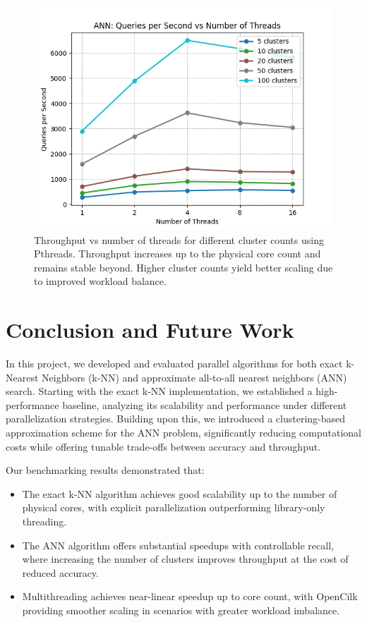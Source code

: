 \documentclass{article}
\begin{document}
\begin{figure}
    \centering
    \includegraphics[width=0.5\linewidth]{figures/ann_throughput_vs_threads.png}
    \caption{Throughput vs number of threads for different cluster counts using Pthreads. Throughput 
    increases up to the physical core count and remains stable beyond. Higher cluster counts yield better 
    scaling due to improved workload balance.}
    \label{fig:ann_throughput_vs_threads}
\end{figure}

\section{Conclusion and Future Work}

In this project, we developed and evaluated parallel algorithms for both exact k-Nearest Neighbors (k-NN) 
and approximate all-to-all nearest neighbors (ANN) search. Starting with the exact k-NN implementation, 
we established a high-performance baseline, analyzing its scalability and performance under different 
parallelization strategies. Building upon this, we introduced a clustering-based approximation scheme 
for the ANN problem, significantly reducing computational costs while offering tunable trade-offs 
between accuracy and throughput.

Our benchmarking results demonstrated that:
\begin{itemize}
    \item The exact k-NN algorithm achieves good scalability up to the number of physical cores, with 
    explicit parallelization outperforming library-only threading.
    \item The ANN algorithm offers substantial speedups with controllable recall, where increasing the 
    number of clusters improves throughput at the cost of reduced accuracy.
    \item Multithreading achieves near-linear speedup up to core count, with OpenCilk providing smoother 
    scaling in scenarios with greater workload imbalance.
\end{itemize}
\end{document}
